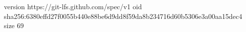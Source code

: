 version https://git-lfs.github.com/spec/v1
oid sha256:6380effd27f0055b440e88be6d9dd8f59da8b234716d60b5306e3a00aa15dec4
size 69
